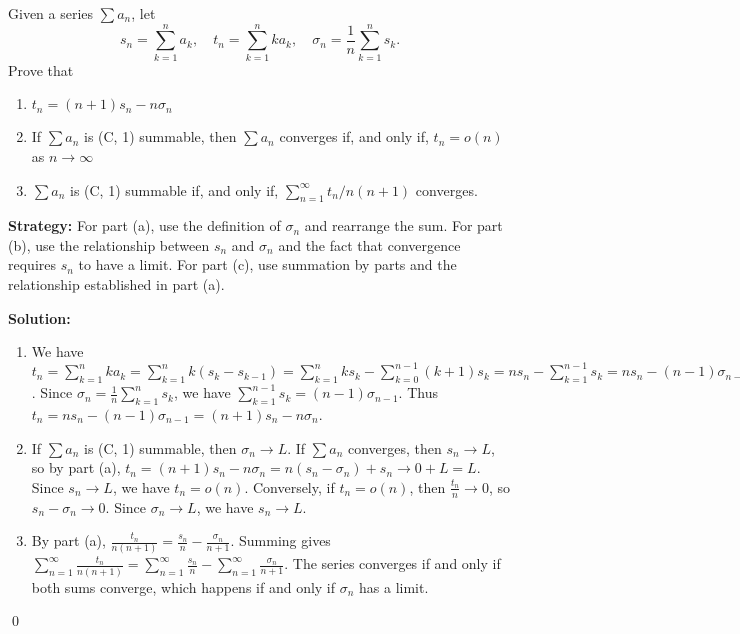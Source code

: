 \begin{problembox}
\begin{problemstatement}
Given a series \(\sum a_n\), let
\[s_n = \sum_{k=1}^{n} a_k, \quad t_n = \sum_{k=1}^{n} k a_k, \quad \sigma_n = \frac{1}{n} \sum_{k=1}^{n} s_k.\]
Prove that
\begin{enumerate}[label=\alph*)]
\item \(t_n = (n + 1)s_n - n\sigma_n\)
\item If \(\sum a_n\) is (C, 1) summable, then \(\sum a_n\) converges if, and only if, \(t_n = o(n)\) as \(n \to \infty\)
\item \(\sum a_n\) is (C, 1) summable if, and only if, \(\sum_{n=1}^{\infty} t_n / n(n + 1)\) converges.
\end{enumerate}
\end{problemstatement}
\end{problembox}

\noindent\textbf{Strategy:} For part (a), use the definition of \(\sigma_n\) and rearrange the sum. For part (b), use the relationship between \(s_n\) and \(\sigma_n\) and the fact that convergence requires \(s_n\) to have a limit. For part (c), use summation by parts and the relationship established in part (a).

\bigskip\noindent\textbf{Solution:}
\begin{enumerate}[label=(\alph*)]
\item We have \(t_n = \sum_{k=1}^n k a_k = \sum_{k=1}^n k(s_k - s_{k-1}) = \sum_{k=1}^n k s_k - \sum_{k=0}^{n-1} (k+1) s_k = n s_n - \sum_{k=1}^{n-1} s_k = n s_n - (n-1)\sigma_{n-1}\). Since \(\sigma_n = \frac{1}{n} \sum_{k=1}^n s_k\), we have \(\sum_{k=1}^{n-1} s_k = (n-1)\sigma_{n-1}\). Thus \(t_n = n s_n - (n-1)\sigma_{n-1} = (n+1)s_n - n\sigma_n\).

\item If \(\sum a_n\) is (C, 1) summable, then \(\sigma_n \to L\). If \(\sum a_n\) converges, then \(s_n \to L\), so by part (a), \(t_n = (n+1)s_n - n\sigma_n = n(s_n - \sigma_n) + s_n \to 0 + L = L\). Since \(s_n \to L\), we have \(t_n = o(n)\). Conversely, if \(t_n = o(n)\), then \(\frac{t_n}{n} \to 0\), so \(s_n - \sigma_n \to 0\). Since \(\sigma_n \to L\), we have \(s_n \to L\).

\item By part (a), \(\frac{t_n}{n(n+1)} = \frac{s_n}{n} - \frac{\sigma_n}{n+1}\). Summing gives \(\sum_{n=1}^{\infty} \frac{t_n}{n(n+1)} = \sum_{n=1}^{\infty} \frac{s_n}{n} - \sum_{n=1}^{\infty} \frac{\sigma_n}{n+1}\). The series converges if and only if both sums converge, which happens if and only if \(\sigma_n\) has a limit.
\end{enumerate}\qed



